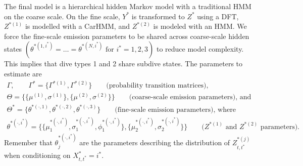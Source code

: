 The final model is a hierarchical hidden Markov model with a traditional HMM on the coarse scale. On the fine scale, $Y^*$ is transformed to $Z^*$ using a DFT, $Z^{*(1)}$ is modelled with a CarHMM, and $Z^{*(2)}$ is modeled with an HMM. We force the fine-scale emission parameters to be shared across coarse-scale hidden states $\left(\theta^{*(1,i^*)} = \ldots = \theta^{*(N,i^*)} \text{ for } i^* = 1,2,3\right)$ to reduce model complexity. This implies that dive types 1 and 2 share subdive states. The parameters to estimate are
%
\begin{gather*}
    \Gamma, \qquad \Gamma^{*} = \{\Gamma^{*(1)},\Gamma^{*(2)}\} \qquad \text{(probability transition matrices)}, \\
    \Theta = \{\{\mu^{(1)},\sigma^{(1)}\},\{\mu^{(2)},\sigma^{(2)}\}\} \qquad \text{(coarse-scale emission parameters), and} \\
    \Theta^* = \{\theta^{*(\cdot,1)},\theta^{*(\cdot,2)},\theta^{*(\cdot,3)}\}  \qquad \text{(fine-scale emission parameters), where} \\
    \theta^{*(\cdot,i^*)} =  \{\{\mu_1^{*(\cdot,i^*)},\sigma_1^{*(\cdot,i^*)},\phi_1^{*(\cdot,i^*)}\},\{\mu_2^{*(\cdot,i^*)},\sigma_2^{*(\cdot,i^*)}\}\} \qquad \text{(}Z^{*(1)} \text{ and } Z^{*(2)} \text{ parameters).}
\end{gather*}
%
Remember that $\theta_j^{*(\cdot,i^*)}$ are the parameters describing the distribution of $Z^{*(j)}_{t,t^*}$ when conditioning on $X^*_{t,t^*} = i^*$. 

